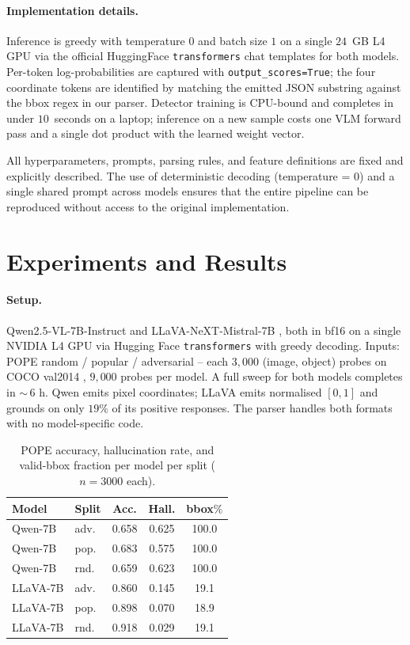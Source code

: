 \documentclass[10pt,twocolumn,letterpaper]{article}
\begin{document}
\paragraph{Implementation details.} Inference is greedy with
temperature $0$ and batch size $1$ on a single $24$~GB L4 GPU via
the official HuggingFace \texttt{transformers} chat templates for
both models. Per-token log-probabilities are captured with
\texttt{output\_scores=True}; the four coordinate tokens are
identified by matching the emitted JSON substring against the bbox
regex in our parser. Detector training is CPU-bound and completes
in under $10$~seconds on a laptop; inference on a new sample costs
one VLM forward pass and a single dot product with the learned
weight vector.

All hyperparameters, prompts, parsing rules, and feature definitions are fixed and explicitly described. The use of deterministic decoding (temperature = 0) and a single shared prompt across models ensures that the entire pipeline can be reproduced without access to the original implementation.

\section{Experiments and Results} \label{sec:exp}

\paragraph{Setup.} Qwen2.5-VL-7B-Instruct \cite{qwen25vl} and
LLaVA-NeXT-Mistral-7B \cite{llavanext}, both in bf16 on a single
NVIDIA L4 GPU via Hugging Face \texttt{transformers} with greedy
decoding. Inputs: POPE random / popular / adversarial -- each
$3{,}000$ (image, object) probes on COCO val2014 \cite{mscoco},
$9{,}000$ probes per model. A full sweep for both models completes in
$\sim$\,6 h. Qwen emits pixel coordinates; LLaVA emits normalised
$[0,1]$ and grounds on only $19\%$ of its positive responses. The
parser handles both formats with no model-specific code.

\begin{table}[!htbp]
\centering\small
\setlength{\tabcolsep}{3pt}
\begin{tabular}{llccc}
\toprule
\textbf{Model} & \textbf{Split} & Acc. & Hall. & bbox$\%$ \\
\midrule
Qwen-7B   & adv. & 0.658 & 0.625 & 100.0 \\
Qwen-7B   & pop. & 0.683 & 0.575 & 100.0 \\
Qwen-7B   & rnd. & 0.659 & 0.623 & 100.0 \\
\addlinespace
LLaVA-7B  & adv. & 0.860 & 0.145 & 19.1 \\
LLaVA-7B  & pop. & 0.898 & 0.070 & 18.9 \\
LLaVA-7B  & rnd. & 0.918 & 0.029 & 19.1 \\
\bottomrule
\end{tabular}
\caption{POPE accuracy, hallucination rate, and valid-bbox
fraction per model per split ($n{=}3000$ each).}
\label{tab:rates}
\end{table}
\end{document}
